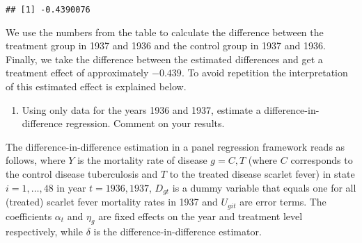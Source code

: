 \documentclass[
]{article}
\newenvironment{Shaded}{\begin{snugshade}}{\end{snugshade}}
\newcommand{\DecValTok}[1]{\textcolor[rgb]{0.00,0.00,0.81}{#1}}
\newcommand{\NormalTok}[1]{#1}
\newcommand{\OtherTok}[1]{\textcolor[rgb]{0.56,0.35,0.01}{#1}}
\newcommand{\SpecialCharTok}[1]{\textcolor[rgb]{0.00,0.00,0.00}{#1}}
\providecommand{\tightlist}{%
  \setlength{\itemsep}{0pt}\setlength{\parskip}{0pt}}
\begin{document}
\begin{Shaded}
\end{Shaded}

\begin{verbatim}
## [1] -0.4390076
\end{verbatim}

We use the numbers from the table to calculate the difference between
the treatment group in 1937 and 1936 and the control group in 1937 and
1936. Finally, we take the difference between the estimated differences
and get a treatment effect of approximately \(-0.439\). To avoid
repetition the interpretation of this estimated effect is explained
below.

\begin{enumerate}
\def\labelenumi{\roman{enumi})}
\setcounter{enumi}{2}
\tightlist
\item
  Using only data for the years 1936 and 1937, estimate a
  difference-in-difference regression. Comment on your results.
\end{enumerate}

The difference-in-difference estimation in a panel regression framework
reads as follows, where \(Y\) is the mortality rate of disease \(g=C,T\)
(where \(C\) corresponds to the control disease tuberculosis and \(T\)
to the treated disease scarlet fever) in state \(i=1,\dots,48\) in year
\(t=1936,1937\), \(D_{gt}\) is a dummy variable that equals one for all
(treated) scarlet fever mortality rates in 1937 and \(U_{git}\) are
error terms. The coefficients \(\alpha_t\) and \(\eta_g\) are fixed
effects on the year and treatment level respectively, while \(\delta\)
is the difference-in-difference estimator.
\end{document}

